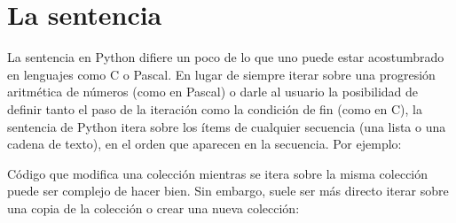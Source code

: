 \documentclass[a4,10pt,spanish]{sphinxmanual}
\begin{document}
\section{La sentencia }
\label{\detokenize{tutorial/controlflow:for-statements}}\label{\detokenize{tutorial/controlflow:tut-for}}
\ignorespaces 
\sphinxAtStartPar
La sentencia  en Python difiere un poco de lo que uno puede estar acostumbrado en lenguajes como C o Pascal. En lugar de siempre iterar sobre una progresión aritmética de números (como en Pascal) o darle al usuario la posibilidad de definir tanto el paso de la iteración como la condición de fin (como en C), la sentencia  de Python itera sobre los ítems de cualquier secuencia (una lista o una cadena de texto), en el orden que aparecen en la secuencia. Por ejemplo:

\begin{sphinxVerbatim}[commandchars=\\\{\}]
  \PYG{p}{[}  \PYG{p}{]}
   
     
\end{sphinxVerbatim}

\sphinxAtStartPar
Código que modifica una colección mientras se itera sobre la misma colección puede ser complejo de hacer bien. Sin embargo, suele ser más directo iterar sobre una copia de la colección o crear una nueva colección:
\end{document}
